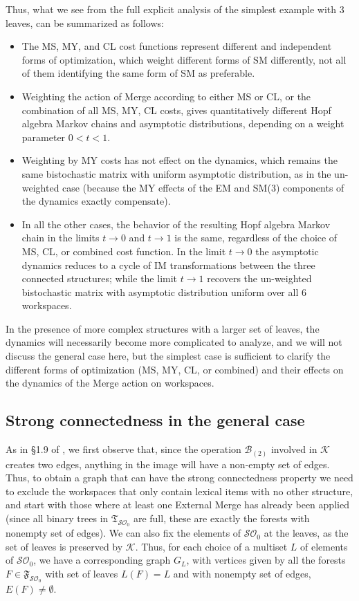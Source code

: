\documentclass[12pt]{amsart}
\numberwithin{equation}{section}
\def\cB{{\mathcal B}}
\def\cK{{\mathcal K}}
\def\cO{{\mathcal O}}
\def\cS{{\mathcal S}}
\def\fT{{\mathfrak T}}
\def\fF{{\mathfrak F}}
\begin{document}
\smallskip

Thus, what we see from the full explicit analysis of the simplest example with 3 leaves, 
can be summarized as follows:
\begin{itemize}
\item  The MS, MY, and CL cost functions represent different and independent forms of 
optimization, which weight different forms of SM differently, not all of them 
identifying the same form of SM as preferable.
\item Weighting the action of Merge according to either MS or CL, or the combination of all MS, MY, CL costs,
gives quantitatively different Hopf algebra Markov chains and asymptotic distributions, depending on a
weight parameter $0<t<1$.
\item Weighting by MY costs has not effect on the dynamics, which remains the same bistochastic matrix
with uniform asymptotic distribution, as in the un-weighted case (because the MY effects of the EM and SM(3) 
components of the dynamics exactly compensate).
\item In all the other cases, the behavior of the resulting Hopf algebra Markov chain in the limits
$t\to 0$ and $t\to 1$ is the same, regardless of the choice of MS, CL, or combined cost function.
In the limit $t\to 0$ the asymptotic dynamics reduces to a cycle of IM transformations between the
three connected structures; while the limit $t\to 1$ recovers the un-weighted bistochastic matrix with
asymptotic distribution uniform over all 6 workspaces. 
\end{itemize}

In the presence of more complex structures with a larger set of leaves, the dynamics
will necessarily become more complicated to analyze, and we will not discuss the
general case here, but the simplest case is sufficient to clarify the different forms of 
optimization (MS, MY, CL, or combined) and their effects on the dynamics of the
Merge action on workspaces. 

\smallskip

\subsection{Strong connectedness in the general case}\label{GenGsec}

As in \S 1.9 of \cite{MCB}, we first observe that, since the operation $\cB_{(2)}$ involved in $\cK$ creates two
edges, anything in the image will have a non-empty set of edges. Thus, to obtain a graph that can have the
strong connectedness property we need to exclude the workspaces that only contain lexical items with
no other structure, and start with those where at least one External Merge has already been applied (since
all binary trees in $\fT_{\cS\cO_0}$ are full, these are exactly the forests with nonempty set of edges). We
can also fix the elements of $\cS\cO_0$ at the leaves, as the set of leaves is preserved by $\cK$. Thus,
for each choice of a multiset $L$ of elements of $\cS\cO_0$, we have a corresponding graph $G_L$, with
vertices given by all the forests $F\in \fF_{\cS\cO_0}$ with set of leaves $L(F)=L$ and with nonempty
set of edges, $E(F)\neq \emptyset$. 
\end{document}
